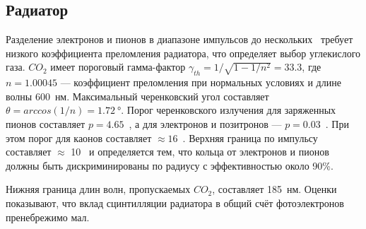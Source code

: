 %                                         

\subsection{Радиатор}


Разделение электронов и пионов в диапазоне импульсов до нескольких~\GeVoverC{} требует низкого коэффициента преломления радиатора, что определяет выбор углекислого газа.%
$CO_{2}$ имеет пороговый гамма-фактор $\gamma _{th} = 1 / \sqrt{1 - 1/n^{2}} = 33.3$, где $n = 1.00045$ --- коэффициент преломления при нормальных условиях и длине волны 600~нм. Максимальный черенковский угол составляет $\theta = arccos(1/n) = \SI{1.72}{\degree}$. Порог черенковского излучения для заряженных пионов составляет $p = 4.65$~\GeVoverC{}, а для электронов и позитронов --- $p = 0.03$~\GeVoverC{}. При этом порог для каонов составляет $\approx 16$~\GeVoverC{}. Верхняя граница по импульсу составляет $\approx$ 10~\GeVoverC{} и определяется тем, что кольца от электронов и пионов должны быть дискриминированы по радиусу с эффективностью около 90\%.

Нижняя граница длин волн, пропускаемых $CO_{2}$, составляет 185~нм. Оценки показывают, что вклад сцинтилляции радиатора в общий счёт фотоэлектронов пренебрежимо мал.




